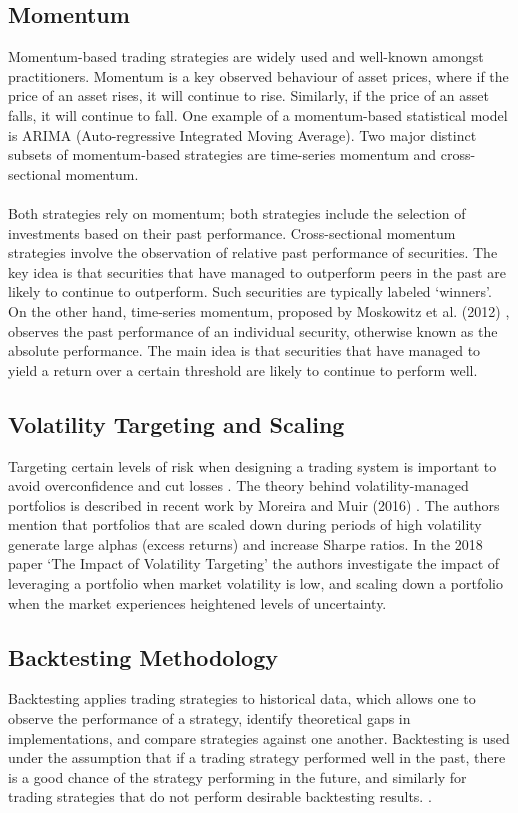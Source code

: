 \subsection{Momentum}
Momentum-based trading strategies are widely used and well-known amongst practitioners. Momentum is a key observed behaviour of asset prices, where if the price of an asset rises, it will continue to rise. Similarly, if the price of an asset falls, it will continue to fall. One example of a momentum-based statistical model is ARIMA (Auto-regressive Integrated Moving Average). Two major distinct subsets of momentum-based strategies are time-series momentum and cross-sectional momentum. \\ \\
Both strategies rely on momentum; both strategies include the selection of investments based on their past performance. Cross-sectional momentum strategies involve the observation of relative past performance of securities. The key idea is that securities that have managed to outperform peers in the past are likely to continue to outperform. Such securities are typically labeled `winners'. On the other hand, time-series momentum, proposed by Moskowitz et al. (2012) \cite{moskowitz2012time}, observes the past performance of an individual security, otherwise known as the absolute performance. The main idea is that securities that have managed to yield a return over a certain threshold are likely to continue to perform well. \cite{bird2017time}

\subsection{Volatility Targeting and Scaling}
Targeting certain levels of risk when designing a trading system is important to avoid overconfidence and cut losses \cite{carver2015systematic}. The theory behind volatility-managed portfolios is described in recent work by Moreira and Muir (2016) \cite{moreira_muir}. The authors mention that portfolios that are scaled down during periods of high volatility generate large alphas (excess returns) and increase Sharpe ratios. In the 2018 paper `The Impact of Volatility Targeting' \cite{vol_target} the authors investigate the impact of leveraging a portfolio when market volatility is low, and scaling down a portfolio when the market experiences heightened levels of uncertainty.

\subsection{Backtesting Methodology}
Backtesting applies trading strategies to historical data, which allows one to observe the performance of a strategy, identify theoretical gaps in implementations, and compare strategies against one another. Backtesting is used under the assumption that if a trading strategy performed well in the past, there is a good chance of the strategy performing in the future, and similarly for trading strategies that do not perform desirable backtesting results. \cite{backtesting_impl}.


